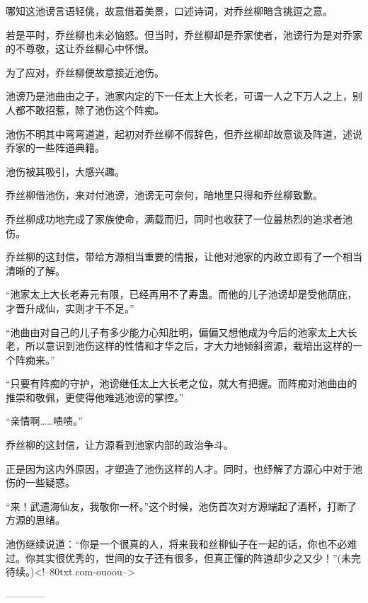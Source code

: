 \begin{this_body}
哪知这池谤言语轻佻，故意借着美景，口述诗词，对乔丝柳暗含挑逗之意。

若是平时，乔丝柳也未必恼怒。但当时，乔丝柳却是乔家使者，池谤行为是对乔家的不尊敬，这让乔丝柳心中怀恨。

为了应对，乔丝柳便故意接近池伤。

池谤乃是池曲由之子，池家内定的下一任太上大长老，可谓一人之下万人之上，别人都不敢招惹，除了池伤这个阵痴。

池伤不明其中弯弯道道，起初对乔丝柳不假辞色，但乔丝柳却故意谈及阵道，述说乔家的一些阵道典籍。

池伤被其吸引，大感兴趣。

乔丝柳借池伤，来对付池谤，池谤无可奈何，暗地里只得和乔丝柳致歉。

乔丝柳成功地完成了家族使命，满载而归，同时也收获了一位最热烈的追求者池伤。

乔丝柳的这封信，带给方源相当重要的情报，让他对池家的内政立即有了一个相当清晰的了解。

“池家太上大长老寿元有限，已经再用不了寿蛊。而他的儿子池谤却是受他荫庇，才晋升成仙，实则才干不足。”

“池曲由对自己的儿子有多少能力心知肚明，偏偏又想他成为今后的池家太上大长老，所以意识到池伤这样的性情和才华之后，才大力地倾斜资源，栽培出这样的一个阵痴来。”

“只要有阵痴的守护，池谤继任太上大长老之位，就大有把握。而阵痴对池曲由的推崇和敬佩，更使得他难逃池谤的掌控。”

“亲情啊……啧啧。”

乔丝柳的这封信，让方源看到池家内部的政治争斗。

正是因为这内外原因，才塑造了池伤这样的人才。同时，也纾解了方源心中对于池伤的一些疑惑。

“来！武遗海仙友，我敬你一杯。”这个时候，池伤首次对方源端起了酒杯，打断了方源的思绪。

池伤继续说道：“你是一个很真的人，将来我和丝柳仙子在一起的话，你也不必难过。你其实很优秀的，世间的女子还有很多，但真正懂的阵道却少之又少！”(未完待续。)<!--80txt.com-ouoou-->

------------

\end{this_body}

